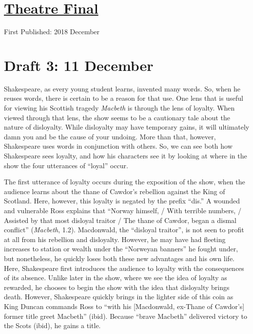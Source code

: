 \documentclass[12pt]{article}[titlepage]
\newcommand{\say}[1]{``#1''}
\newcommand{\1}{\={a}}
\newcommand{\2}{\={e}}
\newcommand{\3}{\={\i}}
\newcommand{\4}{\=o}
\newcommand{\5}{\=u}
\newcommand{\6}{\={A}}
\renewcommand{\,}{\textsuperscript{,}}
\begin{document}
\doublespacing
\section{\href{theatre-final.html}{Theatre Final}}
First Published: 2018 December

\section{Draft 3: 11 December}
Shakespeare, as every young student learns, invented many words.
So, when he reuses words, there is certain to be a reason for that use.
One lens that is useful for viewing his Scottish tragedy \textit{Macbeth} is through the lens of loyalty.
When viewed through that lens, the show seems to be a cautionary tale about the nature of disloyalty.
While disloyalty may have temporary gains, it will ultimately damn you and be the cause of your undoing.
More than that, however, Shakespeare uses words in conjunction with others.
So, we can see both how Shakespeare sees loyalty, and how his characters see it by looking at where in the show the four utterances of \say{loyal} occur.

The first utterance of loyalty occurs during the exposition of the show, when the audience learns about the thane of Cawdor's rebellion against the King of Scotland.
Here, however, this loyalty is negated by the prefix \say{dis.}
A wounded and vulnerable Ross explains that \say{Norway himself, / With terrible numbers, / Assisted by that most disloyal traitor / The thane of Cawdor, began a dismal conflict} (\textit{Macbeth}, 1.2).
Macdonwald, the \say{disloyal traitor}, is not seen to profit at all from his rebellion and disloyalty.
However, he may have had fleeting increases to station or wealth under the \say{Norweyan banners} he fought under, but nonetheless, he quickly loses both these new advantages and his own life.
Here, Shakespeare first introduces the audience to loyalty with the consequences of its absence.
Unlike later in the show, where we see the idea of loyalty as rewarded, he chooses to begin the show with the idea that disloyalty brings death.
However, Shakespeare quickly brings in the lighter side of this coin as King Duncan commands Ross to \say{with his [Macdonwald, ex-Thane of Cawdor's] former title greet Macbeth} (ibid).
Because \say{brave Macbeth} delivered victory to the Scots (ibid), he gains a title.
\end{document}
